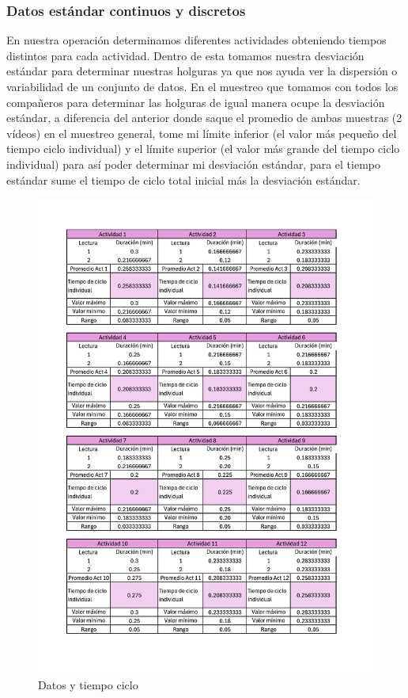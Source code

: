 \subsubsection{Datos estándar continuos y discretos}
En nuestra operación determinamos diferentes actividades obteniendo tiempos distintos para cada actividad. 
Dentro de esta tomamos nuestra desviación estándar para determinar nuestras holguras ya que nos ayuda ver la dispersión o variabilidad de un conjunto de datos.
En el muestreo que tomamos con todos los compañeros para determinar las holguras de igual manera ocupe la desviación estándar, a diferencia del anterior  donde saque el promedio de ambas muestras (2 vídeos) en el muestreo general, tome mi límite inferior (el valor más pequeño del tiempo ciclo individual) y el límite superior (el valor más grande del tiempo ciclo individual) para así poder determinar mi desviación estándar, para el tiempo estándar sume el tiempo de ciclo total inicial más la desviación estándar.
% 
% 
    \begin{figure}[H]
        \centering
        \includegraphics[trim = {5mm 15mm 5mm 
        0mm},clip,scale=0.45]{16/Img/datosEstandar.pdf}
        \caption{Datos y tiempo ciclo}
        \label{fig:Datos y tiempo ciclo}
    \end{figure}
